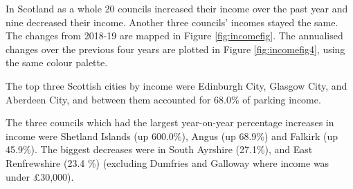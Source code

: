 \documentclass[
  12pt,
]{article}
\begin{document}
In Scotland as a whole 20 councils increased their income over the past year and nine decreased their income. Another three councils' incomes stayed the same.
The changes from 2018-19 are mapped in Figure \ref{fig:incomefig}. The annualised changes over the previous four years are plotted in Figure \ref{fig:incomefig4}, using the same colour palette.

The top three Scottish cities by income were Edinburgh City, Glasgow City, and Aberdeen City, and between them accounted for 68.0\% of parking income.

The three councils which had the largest year-on-year percentage increases in income were Shetland Islands (up 600.0\%), Angus (up 68.9\%) and Falkirk (up 45.9\%).
The biggest decreases were in South Ayrshire (27.1\%), and East Renfrewshire (23.4 \%) (excluding Dumfries and Galloway where income was under £30,000).

\begingroup\fontsize{9}{11}\selectfont
\end{document}
